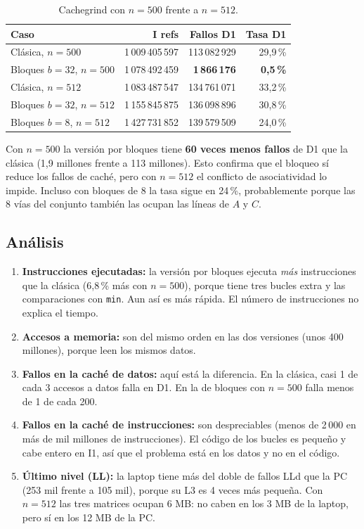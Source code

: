 \documentclass[11pt]{article}
\begin{document}
\begin{table}[H]
\centering
\caption{Cachegrind con $n=500$ frente a $n=512$.}
\label{tab:cg500}
\begin{tabular}{lrrr}
\toprule
Caso & I refs & Fallos D1 & Tasa D1 \\
\midrule
Clásica, $n=500$ & 1\,009\,405\,597 & 113\,082\,929 & 29,9\,\% \\
Bloques $b=32$, $n=500$ & 1\,078\,492\,459 & \textbf{1\,866\,176} & \textbf{0,5\,\%} \\
\midrule
Clásica, $n=512$ & 1\,083\,487\,547 & 134\,761\,071 & 33,2\,\% \\
Bloques $b=32$, $n=512$ & 1\,155\,845\,875 & 136\,098\,896 & 30,8\,\% \\
Bloques $b=8$, $n=512$ & 1\,427\,731\,852 & 139\,579\,509 & 24,0\,\% \\
\bottomrule
\end{tabular}
\end{table}

Con $n=500$ la versión por bloques tiene \textbf{60 veces menos fallos} de
D1 que la clásica (1,9 millones frente a 113 millones). Esto confirma que el
bloqueo sí reduce los fallos de caché, pero con $n=512$ el conflicto de
asociatividad lo impide. Incluso con bloques de 8 la tasa sigue en 24\,\%,
probablemente porque las 8 vías del conjunto también las ocupan las líneas
de $A$ y $C$.

\subsection{Análisis}

\begin{enumerate}
\item \textbf{Instrucciones ejecutadas:} la versión por bloques ejecuta
      \emph{más} instrucciones que la clásica (6,8\,\% más con $n=500$),
      porque tiene tres bucles extra y las comparaciones con \texttt{min}. Aun así
      es más rápida. El número de instrucciones no explica el tiempo.
\item \textbf{Accesos a memoria:} son del mismo orden en las dos versiones
      (unos 400 millones), porque leen los mismos datos.
\item \textbf{Fallos en la caché de datos:} aquí está la diferencia. En la
      clásica, casi 1 de cada 3 accesos a datos falla en D1. En la de
      bloques con $n=500$ falla menos de 1 de cada 200.
\item \textbf{Fallos en la caché de instrucciones:} son despreciables (menos
      de 2\,000 en más de mil millones de instrucciones). El código de los
      bucles es pequeño y cabe entero en I1, así que el problema está en los
      datos y no en el código.
\item \textbf{Último nivel (LL):} la laptop tiene más del doble de fallos LLd
      que la PC (253 mil frente a 105 mil), porque su L3 es 4 veces más
      pequeña. Con $n=512$ las tres matrices ocupan 6 MB: no caben en los
      3 MB de la laptop, pero sí en los 12 MB de la PC.
\end{enumerate}
\end{document}
